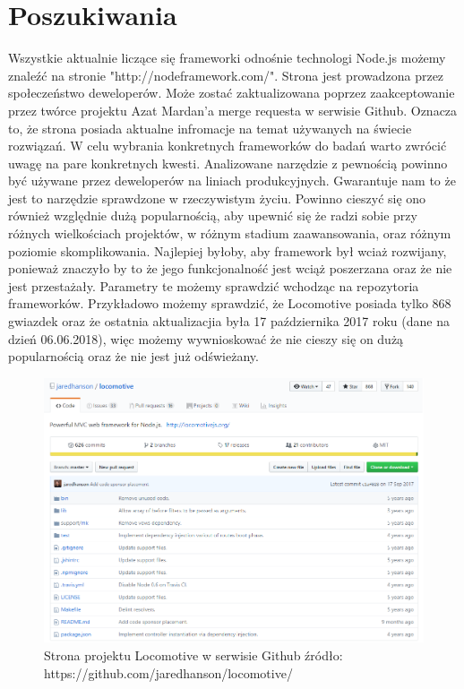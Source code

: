 \documentclass[12pt]{report}
\begin{document}
  \section{Poszukiwania}
    Wszystkie aktualnie liczące się frameworki odnośnie technologi Node.js możemy znaleźć na stronie "http://nodeframework.com/".
    Strona jest prowadzona przez społeczeństwo deweloperów.
    Może zostać zaktualizowana poprzez zaakceptowanie przez twórce projektu Azat Mardan'a merge requesta w serwisie Github.
    Oznacza to, że strona posiada aktualne infromacje na temat używanych na świecie rozwiązań.
    W celu wybrania konkretnych frameworków do badań warto zwrócić uwagę na pare konkretnych kwesti.
    Analizowane narzędzie z pewnością powinno być używane przez deweloperów na liniach produkcyjnych.
    Gwarantuje nam to że jest to narzędzie sprawdzone w rzeczywistym życiu.
    Powinno cieszyć się ono również względnie dużą popularnością, aby upewnić się że radzi sobie przy różnych wielkościach projektów, w różnym stadium zaawansowania, oraz różnym poziomie skomplikowania.
    Najlepiej byłoby, aby framework był wciaż rozwijany, ponieważ znaczyło by to że jego funkcjonalność jest wciąż poszerzana oraz że nie jest przestażały.
    Parametry te możemy sprawdzić wchodząc na repozytoria frameworków.
    Przykładowo możemy sprawdzić, że Locomotive posiada tylko 868 gwiazdek oraz że ostatnia aktualizacjia była 17 października 2017 roku (dane na dzień 06.06.2018), więc możemy wywnioskować że nie cieszy się on dużą popularnością oraz że nie jest już odświeżany.
    \begin{figure}[!hb]
      \centering
      \includegraphics[width=\textwidth,height=\textheight,keepaspectratio]{locomotive.png} 
      \caption{Strona projektu Locomotive w serwisie Github \newline źródło: https://github.com/jaredhanson/locomotive/}
    \end{figure}
\end{document}
